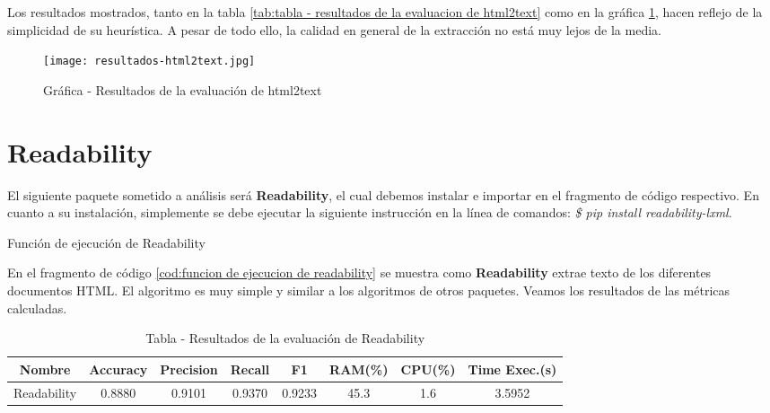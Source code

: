 Los resultados mostrados, tanto en la tabla \ref{tab:tabla - resultados de la evaluacion de html2text} como
en la gráfica \ref{img:grafica - resultados de la evaluacion de html2text}, hacen reflejo de la simplicidad
de su heurística. A pesar de todo ello, la calidad en general de la extracción no está muy lejos de la media.

\begin{figure}[tphb]
    \centering
    \texttt{[image: resultados-html2text.jpg]}
    \caption{Gráfica - Resultados de la evaluación de html2text}
    \label{img:grafica - resultados de la evaluacion de html2text}
\end{figure}

\section*{Readability}

El siguiente paquete sometido a análisis será \textbf{Readability}, el cual debemos instalar e importar 
en el fragmento de código respectivo. En cuanto a su instalación, simplemente se debe ejecutar la siguiente 
instrucción en la línea de comandos: \emph{\$ pip install readability-lxml}.

\begin{codefloat}
    
    \caption{Función de ejecución de Readability}
    \label{cod:funcion de ejecucion de readability}
\end{codefloat}

En el fragmento de código \ref{cod:funcion de ejecucion de readability} se muestra como \textbf{Readability}
extrae texto de los diferentes documentos HTML. El algoritmo es muy simple y similar a los algoritmos de
otros paquetes. Veamos los resultados de las métricas calculadas.

\begin{table}[h]
    \begin{center}
      \begin{tabular}{| c | c | c | c | c | c | c | c |} \hline 
       \textbf{Nombre} & \textbf{Accuracy} & \textbf{Precision}  & \textbf{Recall} & \textbf{F1} & \textbf{RAM(\%)} & \textbf{CPU(\%)} & \textbf{Time Exec.(s)} \\ \hline
       Readability & 0.8880 & 0.9101 & 0.9370 & 0.9233 & 45.3 & 1.6 & 3.5952 \\ \hline
      \end{tabular}
      \caption{Tabla - Resultados de la evaluación de Readability}
      \label{tab:tabla - resultados de la evaluacion de readability}
    \end{center}
\end{table}


